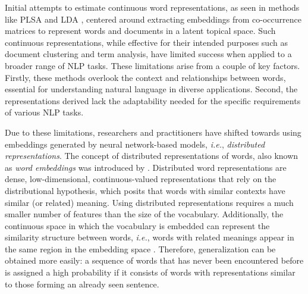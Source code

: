Initial attempts to estimate continuous word representations, as seen in methods like \ac{PLSA} \citep{hofmann2001unsupervised} and \ac{LDA} \citep{blei2003latent}, centered around extracting embeddings from co-occurrence matrices to represent words and documents in a latent topical space. Such continuous representations, while effective for their intended purposes such as document clustering and term analysis, have limited success when applied to a broader range of \ac{NLP} tasks. These limitations arise from a couple of key factors. Firstly, these methods overlook the context and relationships between words, essential for understanding natural language in diverse applications. Second, the representations derived lack the adaptability needed for the specific requirements of various \ac{NLP} tasks.


Due to these limitations, researchers and practitioners have shifted towards using embeddings generated by neural network-based models, \textit{i.e.}, \textit{distributed representations}. The concept of distributed representations of words, also known as \textit{word embeddings} was introduced by \citet{bengio2000neural}. Distributed word representations are dense, low-dimensional, continuous-valued representations that rely on the distributional hypothesis, which posits that words with similar contexts have similar (or related) meaning. Using distributed representations requires a much smaller number of features than the size of the vocabulary. Additionally, the continuous space in which the vocabulary is embedded can represent the similarity structure between words, \textit{i.e.}, words with related meanings appear in the same region in the embedding space \citep{shazeer2016swivel}. Therefore, generalization can be obtained more easily: a sequence of words that has never been encountered before is assigned a high probability if it consists of words with representations similar to those forming an already seen sentence. 


